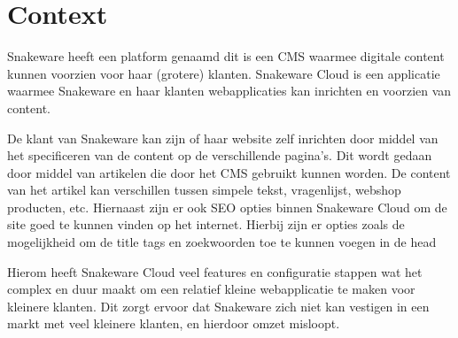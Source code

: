\section{Context}
Snakeware heeft een platform genaamd  dit is een \gls{CMS} waarmee digitale content kunnen voorzien voor haar (grotere) klanten.
Snakeware Cloud is een applicatie waarmee Snakeware en haar klanten webapplicaties kan inrichten en voorzien van content.

\whitespace[2]
De klant van Snakeware kan zijn of haar website zelf inrichten door middel van het specificeren van de content op de verschillende pagina’s.
Dit wordt gedaan door middel van artikelen die door het \gls{CMS} gebruikt kunnen worden.
De content van het artikel kan verschillen tussen simpele tekst, vragenlijst, webshop producten, etc.
Hiernaast zijn er ook \gls{SEO} opties binnen Snakeware Cloud om de site goed te kunnen vinden op het internet.
Hierbij zijn er opties zoals de mogelijkheid om de title tags en zoekwoorden toe te kunnen voegen in de head \Parencite{HTMLhead}

\whitespace[2]
Hierom heeft Snakeware Cloud veel features en configuratie stappen wat het complex en duur maakt om een relatief kleine webapplicatie te maken voor kleinere klanten.
Dit zorgt ervoor dat Snakeware zich niet kan vestigen in een markt met veel kleinere klanten, en hierdoor omzet misloopt.
